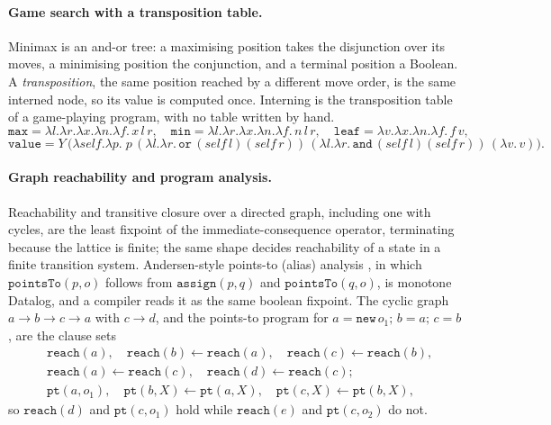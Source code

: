 \paragraph{Game search with a transposition table.}
Minimax is an and-or tree: a maximising position takes the disjunction over its moves, a minimising
position the conjunction, and a terminal position a Boolean. A \emph{transposition}, the same
position reached by a different move order, is the same interned node, so its value is computed
once. Interning is the transposition table of a game-playing program, with no table written by hand.
\[
  \mathtt{max} = \lambda l.\lambda r.\lambda x.\lambda n.\lambda f.\,x\,l\,r, \quad
  \mathtt{min} = \lambda l.\lambda r.\lambda x.\lambda n.\lambda f.\,n\,l\,r, \quad
  \mathtt{leaf} = \lambda v.\lambda x.\lambda n.\lambda f.\,f\,v,
\]
\[
  \mathtt{value} = Y\,\big(\lambda\mathit{self}.\lambda p.\;
    p\,(\lambda l.\lambda r.\,\mathtt{or}\,(\mathit{self}\,l)(\mathit{self}\,r))\,
  (\lambda l.\lambda r.\,\mathtt{and}\,(\mathit{self}\,l)(\mathit{self}\,r))\,(\lambda v.\,v)\big).
\]

\paragraph{Graph reachability and program analysis.}
Reachability and transitive closure over a directed graph, including one with cycles, are the least
fixpoint of the immediate-consequence operator, terminating because the lattice is finite; the same
shape decides reachability of a state in a finite transition system. Andersen-style points-to (alias)
analysis , in which $\mathtt{pointsTo}(p,o)$ follows from
$\mathtt{assign}(p,q)$ and $\mathtt{pointsTo}(q,o)$, is monotone Datalog, and a compiler reads it as
the same boolean fixpoint. The cyclic graph $a\to b\to c\to a$ with $c\to d$, and the points-to
program for $a=\mathtt{new}\,o_1;\,b=a;\,c=b$, are the clause sets
\[
  \begin{aligned}
    &\mathtt{reach}(a),\quad \mathtt{reach}(b)\leftarrow\mathtt{reach}(a),\quad
    \mathtt{reach}(c)\leftarrow\mathtt{reach}(b),\\
    &\mathtt{reach}(a)\leftarrow\mathtt{reach}(c),\quad \mathtt{reach}(d)\leftarrow\mathtt{reach}(c);\\
    &\mathtt{pt}(a,o_1),\quad \mathtt{pt}(b,X)\leftarrow\mathtt{pt}(a,X),\quad
    \mathtt{pt}(c,X)\leftarrow\mathtt{pt}(b,X),
  \end{aligned}
\]
so $\mathtt{reach}(d)$ and $\mathtt{pt}(c,o_1)$ hold while $\mathtt{reach}(e)$ and $\mathtt{pt}(c,o_2)$
do not.


